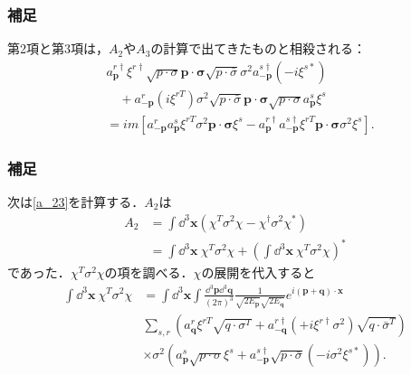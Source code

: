 \documentclass[pdflatex,unicode,ja=standard,12pt]{beamer}
\begin{document}
\begin{frame}[noframenumbering]
  
  \frametitle{補足\ \subsecname}
  \thispagestyle{empty}

  第2項と第3項は，$A_2$や$A_3$の計算で出てきたものと相殺される：
  \begin{align}
    &
    a_{\mathbf{p}}^{r\dag}\xi^{r\dag}
    \sqrt{p\cdot\sigma}\mathbf{p}\cdot\bm{\sigma}\sqrt{p\cdot\bar{\sigma}}
    \sigma^2 a_{-\mathbf{p}}^{s\dag}(-i\xi^{s*})
    \nonumber
    \\
    &\quad
    +
    a_{-\mathbf{p}}^{r}(i\xi^{rT})\sigma^2
    \sqrt{p\cdot\bar{\sigma}}\mathbf{p}\cdot\bm{\sigma}\sqrt{p\cdot\sigma}
    a_{\mathbf{p}}^s\xi^s
    \nonumber
    \\
    &=
    im\left[  
      a_{-\mathbf{p}}^ra_{\mathbf{p}}^s
      \xi^{rT}\sigma^2\mathbf{p}\cdot\bm{\sigma}\xi^s
      -
      a_{\mathbf{p}}^{r\dag}a_{-\mathbf{p}}^{s\dag}
      \xi^{rT}\mathbf{p}\cdot\bm{\sigma}\sigma^2\xi^s      
    \right]
    .
  \end{align}

\end{frame}

\begin{frame}[noframenumbering]
  
  \frametitle{補足\ \subsecname}
  \thispagestyle{empty}

  次は\eqref{a_23}を計算する．$A_2$は
  \begin{align}
    A_2
    &=
    \int\dd^3\mathbf{x}
    \left(  
      \chi^{T}\sigma^{2}\chi
      -
      \chi^{\dag}\sigma^2\chi^{*}
    \right)
    \nonumber
    \\
    &=
    \int\dd^3\mathbf{x}\ 
    \chi^{T}\sigma^{2}\chi
    +
    \left(        
      \int\dd^3\mathbf{x}\ 
      \chi^{T}\sigma^{2}\chi
    \right)^*
  \end{align}
  であった．$\chi^{T}\sigma^{2}\chi$の項を調べる．$\chi$の展開を代入すると
  \begin{align}
    \int\dd^3\mathbf{x}\ 
    \chi^{T}\sigma^{2}\chi
    &=
    \int\dd^3\mathbf{x}\int\frac{\dd^3\mathbf{p}\dd^3\mathbf{q}}{(2\pi)^3}\frac{1}{\sqrt{2E_{\mathbf{p}}}\sqrt{2E_{\mathbf{q}}}}e^{i(\mathbf{p}+\mathbf{q})\cdot\mathbf{x}}
    \nonumber
    \\
    &
    \sum_{s,r}
    (
      a_{\mathbf{q}}^{r}\xi^{rT}\sqrt{q\cdot\sigma^{T}}
      +
      a_{-\mathbf{q}}^{r\dag}(+i\xi^{r\dag}\sigma^2)\sqrt{q\cdot\bar{\sigma}^{T}}
    )
    \nonumber
    \\
    &
    \times\sigma^2
    (
      a_{\mathbf{p}}^s\sqrt{p\cdot\sigma}\xi^s
      +
      a_{-\mathbf{p}}^{s\dag}\sqrt{p\cdot\bar{\sigma}}(-i\sigma^2\xi^{s*})
    )
    .
    \label{a2_1}
  \end{align}

\end{frame}
\end{document}
